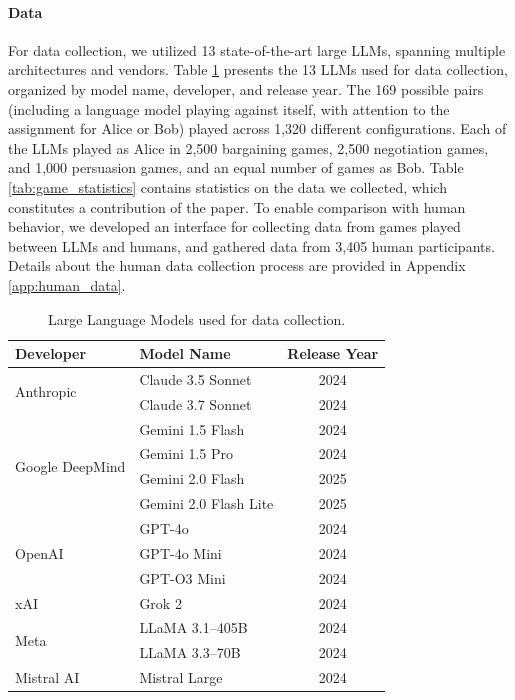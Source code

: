 \paragraph{Data}
For data collection, we utilized 13 state-of-the-art large LLMs, spanning multiple architectures and vendors. Table \ref{tab:llm_list} presents the 13 LLMs used for data collection, organized by model name, developer, and release year.
The 169 possible pairs (including a language model playing against itself, with attention to the assignment for Alice or Bob) played across 1,320 different configurations. Each of the LLMs played as Alice in 2,500 bargaining games, 2,500 negotiation games, and 1,000 persuasion games, and an equal number of games as Bob. Table \ref{tab:game_statistics} contains statistics on the data we collected, which constitutes a contribution of the paper.
To enable comparison with human behavior, we developed an interface for collecting data from games played between LLMs and humans, and gathered data from 3,405 human participants. Details about the human data collection process are provided in Appendix \ref{app:human_data}.

\begin{table}[h!]
\centering
\caption{Large Language Models used for data collection.}
\begin{tabular}{llc}
\hline
\textbf{Developer} & \textbf{Model Name} & \textbf{Release Year} \\
\hline
\multirow{2}{*}{Anthropic} & Claude 3.5 Sonnet & 2024 \\
 & Claude 3.7 Sonnet & 2024 \\
\hline
\multirow{4}{*}{Google DeepMind} & Gemini 1.5 Flash & 2024 \\
 & Gemini 1.5 Pro & 2024 \\
 & Gemini 2.0 Flash & 2025 \\
 & Gemini 2.0 Flash Lite & 2025 \\
\hline
\multirow{3}{*}{OpenAI} & GPT-4o & 2024 \\
 & GPT-4o Mini & 2024 \\
 & GPT-O3 Mini & 2024 \\
\hline
xAI & Grok 2 & 2024 \\
\hline
\multirow{2}{*}{Meta} & LLaMA 3.1–405B & 2024 \\
 & LLaMA 3.3–70B & 2024 \\
\hline
Mistral AI & Mistral Large & 2024 \\

\hline
\end{tabular}
\label{tab:llm_list}
\end{table}


